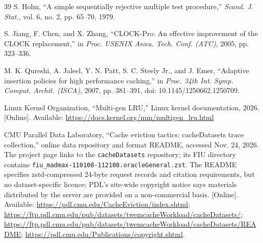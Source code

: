 \documentclass[10pt,twocolumn,a4paper]{IEEEtran}
\begin{document}
\begin{thebibliography}{39}
 S. Holm, ``A simple sequentially rejective multiple test
procedure,'' \emph{Scand. J. Stat.}, vol. 6, no. 2, pp. 65--70, 1979.

 S. Jiang, F. Chen, and X. Zhang, ``CLOCK-Pro: An effective
improvement of the CLOCK replacement,'' in \emph{Proc. USENIX Annu. Tech. Conf.
(ATC)}, 2005, pp. 323--336.

 M. K. Qureshi, A. Jaleel, Y. N. Patt, S. C. Steely Jr., and J.
Emer, ``Adaptive insertion policies for high performance caching,'' in
\emph{Proc. 34th Int. Symp. Comput. Archit. (ISCA)}, 2007, pp. 381--391, doi:
10.1145/1250662.1250709.

 Linux Kernel Organization, ``Multi-gen LRU,'' Linux kernel
documentation, 2026. [Online]. Available:
\url{https://docs.kernel.org/mm/multigen_lru.html}

 CMU Parallel Data Laboratory, ``Cache eviction tactics:
cacheDatasets trace collection,'' online data repository and format README,
accessed Nov. 24, 2026. The project page links to the \texttt{cacheDatasets}
repository; its FIU directory contains
\texttt{fiu\_madmax-110108-112108.oracleGeneral.zst}. The README specifies
zstd-compressed 24-byte request records and citation requirements, but no
dataset-specific licence; PDL's site-wide copyright notice says materials
distributed by the server are provided on a non-commercial basis. [Online].
Available: \url{https://pdl.cmu.edu/CacheEviction/index.shtml};
\url{https://ftp.pdl.cmu.edu/pub/datasets/twemcacheWorkload/cacheDatasets/};
\url{https://ftp.pdl.cmu.edu/pub/datasets/twemcacheWorkload/cacheDatasets/README};
\url{https://pdl.cmu.edu/Publications/copyright.shtml}.

\end{thebibliography}
\end{document}
